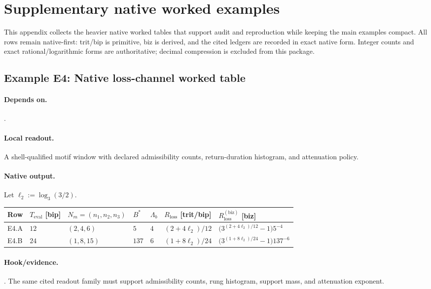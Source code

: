 \section{Supplementary native worked examples}\label{app:supp-native-examples}

This appendix collects the heavier native worked tables that support audit and reproduction while keeping the main examples compact. All rows remain native-first: trit/bip is primitive, biz is derived, and the cited ledgers are recorded in exact native form. Integer counts and exact rational/logarithmic forms are authoritative; decimal compression is excluded from this package.

\subsection{Example E4: Native loss-channel worked table}\label{ex:e4}
\paragraph{Depends on.} .
\paragraph{Local readout.} A shell-qualified motif window with declared admissibility counts, return-duration histogram, and attenuation policy.
\paragraph{Native output.} Let $\ell_2:=\log_3(3/2)$.
{\footnotesize
\begin{center}
\begin{tabular}{@{}lllllll@{}}
\toprule
Row & $T_{\mathrm{eval}}$ [bip] & $N_m=(n_1,n_2,n_3)$ & $B^*$ & $\Lambda_b$ & $R_{\mathrm{loss}}$ [trit/bip] & $R_{\mathrm{loss}}^{(\mathrm{biz})}$ [biz] \\
\midrule
E4.A & $12$ & $(2,4,6)$ & $5$ & $4$ & $(2+4\ell_2)/12$ & $\bigl(3^{(2+4\ell_2)/12}-1\bigr)5^{-4}$ \\
E4.B & $24$ & $(1,8,15)$ & $137$ & $6$ & $(1+8\ell_2)/24$ & $\bigl(3^{(1+8\ell_2)/24}-1\bigr)137^{-6}$ \\
\bottomrule
\end{tabular}
\end{center}}
\paragraph{Hook/evidence.} . The same cited readout family must support admissibility counts, rung histogram, support mass, and attenuation exponent.

